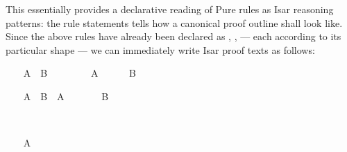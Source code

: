 \begin{isabellebody}
\begin{isamarkuptext}
  \noindent This essentially provides a declarative reading of Pure
  rules as Isar reasoning patterns: the rule statements tells how a
  canonical proof outline shall look like.  Since the above rules have
  already been declared as \hyperlink{attribute.Pure.intro}{\mbox{}}, \hyperlink{attribute.Pure.elim}{\mbox{}}, \hyperlink{attribute.Pure.dest}{\mbox{}} --- each according to its
  particular shape --- we can immediately write Isar proof texts as
  follows:%
\end{isamarkuptext}%
\isamarkuptrue%
%
\isadelimproof
%
\endisadelimproof
%
\isatagproof
%
\begin{minipage}[t]{0.4\textwidth}
\isanewline
\ \ \isamarkupfalse%
\ {\isachardoublequoteopen}A\ {\isasymlongrightarrow}\ B{\isachardoublequoteclose}\isanewline
\ \ \isamarkupfalse%
\isanewline
\ \ \ \ \isamarkupfalse%
\ A\isanewline
\ \ \ \ \isamarkupfalse%
\ B%
\endisatagproof
{\isafoldproof}%
%
\isadelimproof
%
\endisadelimproof
%
\isadelimnoproof
\ %
\endisadelimnoproof
%
\isatagnoproof
{}\isamarkupfalse%
%
\endisatagnoproof
{\isafoldnoproof}%
%
\isadelimnoproof
\isanewline
%
\endisadelimnoproof
%
\isadelimproof
\ \ %
\endisadelimproof
%
\isatagproof
{}\isamarkupfalse%
%
\end{minipage}\qquad\begin{minipage}[t]{0.4\textwidth}
\isanewline
\ \ \isamarkupfalse%
\ {\isachardoublequoteopen}A\ {\isasymlongrightarrow}\ B{\isachardoublequoteclose}\ \ A%
\endisatagproof
{\isafoldproof}%
%
\isadelimproof
%
\endisadelimproof
%
\isadelimnoproof
\ %
\endisadelimnoproof
%
\isatagnoproof
{}\isamarkupfalse%
%
\endisatagnoproof
{\isafoldnoproof}%
%
\isadelimnoproof
\isanewline
%
\endisadelimnoproof
%
\isadelimproof
\ \ %
\endisadelimproof
%
\isatagproof
{}\isamarkupfalse%
\ \isamarkupfalse%
\ B\ \isacommand{{\isachardot}{\isachardot}}\isamarkupfalse%
%
\end{minipage}\\[3ex]\begin{minipage}[t]{0.4\textwidth}
\isanewline
\ \ \isamarkupfalse%
\ A%
\endisatagproof
{\isafoldproof}%
%
\isadelimproof
%
\endisadelimproof
%
\isadelimnoproof
\ %
\endisadelimnoproof
%
\isatagnoproof
{}\isamarkupfalse%
%
\endisatagnoproof
{\isafoldnoproof}%
%
\isadelimnoproof
\isanewline
%
\endisadelimnoproof
%
\isadelimproof
\ \ %
\endisadelimproof

\end{minipage}
\end{isabellebody}
